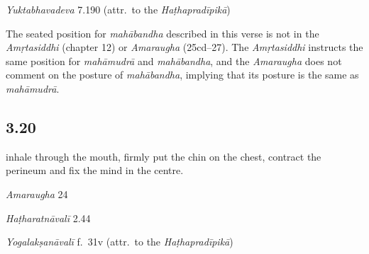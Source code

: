 \begin{ekdosis}
\begin{testimonia}[hp03_019]
\emph{Yuktabhavadeva} 7.190 (attr.~to the \emph{Haṭhapradīpikā})
\begin{versinnote}
\end{versinnote}
\end{testimonia}

\begin{philcomm}[hp03_019]
The seated position for \emph{mahābandha} described in this verse is not in the \emph{Amṛtasiddhi} (chapter 12) or \emph{Amaraugha} (25cd–27). The \emph{Amṛtasiddhi} instructs the same position for \emph{mahāmudrā} and \emph{mahābandha}, and the \emph{Amaraugha} does not comment on the posture of \emph{mahābandha}, implying that its posture is the same as \emph{mahāmudrā}.
\end{philcomm}

\subsection*{3.20}
\begin{translation}[hp03_020]
[\dots] inhale through the mouth, firmly put the chin on the chest, contract the perineum and fix the mind in the centre.
\end{translation}

\begin{sources}[hp03_020]
\emph{Amaraugha} 24
\begin{versinnote}
\tl{\var{nibhṛtya ] nibhṛtaṃ \vl}\\!}
\end{versinnote}
\end{sources}

\begin{testimonia}[hp03_020]
\emph{Haṭharatnāvalī} 2.44
\begin{versinnote}
\tl{\var{nibhṛtya ] niṣpīḍya \vl}\\!}
\end{versinnote}

\emph{Yogalakṣanāvalī} f.~31v (attr.~to the \emph{Haṭhapradīpikā})
\begin{versinnote}
\end{versinnote}


\end{testimonia}
\end{ekdosis}
